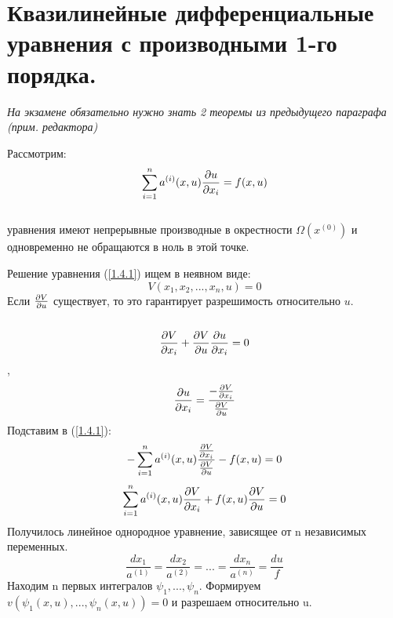 \documentclass[../main.tex]{subfiles}
\begin{document}
\section{Квазилинейные дифференциальные уравнения с производными 1-го порядка.}


\textit{На экзамене обязательно нужно знать 2 теоремы из предыдущего параграфа (прим. редактора)}


\par Рассмотрим:
\begin{equation}\label{1.4.1}
	\sum_{i=1}^{n}a^{(i)}(x,u)\frac{\partial u}{\partial x_i}=f(x,u)
\end{equation}
\\ уравнения имеют непрерывные производные в окрестности $\Omega(x^{(0)})$ и одновременно не обращаются в ноль в этой точке.\\

\par Решение уравнения (\ref{1.4.1}) ищем в неявном виде:
$$V(x_1,x_2,...,x_n,u)=0$$
Если $\frac{\partial V}{\partial u}$ существует, то это гарантирует разрешимость относительно $u$.
\\ \\
\[\frac{\partial V}{\partial x_i}+\frac{\partial V}{\partial u}\frac{\partial u}{\partial x_i} = 0\],
\[ \frac{\partial u}{\partial x_i} = \frac{-\frac{\partial V}{\partial x_i}}{\frac{\partial V}{\partial u}}\] 
Подставим в (\ref{1.4.1}):\\

$$-\sum_{i=1}^{n}a^{(i)}(x,u)\frac{\frac{\partial V}{\partial x_i}}{\frac{\partial V}{\partial u}}-f(x,u)=0$$
$$\sum_{i=1}^{n}a^{(i)}(x,u)\frac{\partial V}{\partial x_i}+f(x,u)\frac{\partial V}{\partial u} = 0$$
Получилось линейное однородное уравнение, зависящее от n независимых переменных.
$$\frac{dx_1}{a^{(1)}}=\frac{dx_2}{a^{(2)}}=...=\frac{dx_n}{a^{(n)}}=\frac{du}{f}$$
Находим n первых интегралов $\psi_1,...,\psi_n$. Формируем $v(\psi_1(x,u),...,\psi_n(x,u))=0$ и разрешаем относительно u.
\end{document}
